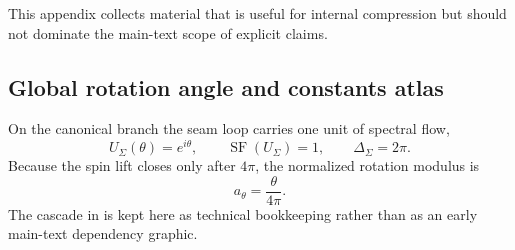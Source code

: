 \documentclass[11pt,a4paper]{article}
\theoremstyle{definition}
\theoremstyle{remark}
\DeclareMathOperator{\SF}{SF}
\newcommand{\Seam}{\Sigma}
\newcommand{\atheta}{a_\theta}
\begin{document}
This appendix collects material that is useful for internal compression but should not dominate the main-text scope of explicit claims.

\subsection{Global rotation angle and constants atlas}

On the canonical branch the seam loop carries one unit of spectral flow,
\[
U_{\Seam}(\theta)=e^{i\theta},
\qquad
\SF(U_{\Seam})=1,
\qquad
\Delta_{\Seam}=2\pi.
\]
Because the spin lift closes only after $4\pi$, the normalized rotation modulus is
\[
\atheta=\frac{\theta}{4\pi}.
\]
The cascade in  is kept here as technical bookkeeping rather than as an early main-text dependency graphic.
\end{document}
